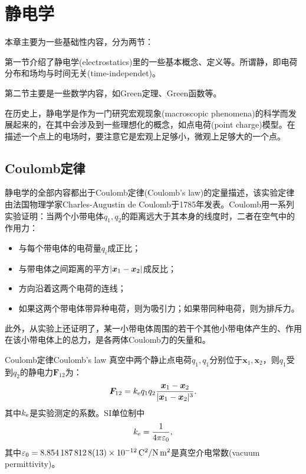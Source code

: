 \chapter{静电学}
\label{chap:electrostatics}

本章主要为一些基础性内容，分为两节：
\begin{compactenum}
    \item 第一节介绍了静电学(electrostatics)里的一些基本概念、定义等。所谓静，即电荷分布和场均与时间无关(time-independet)。
    \item 第二节主要是一些数学内容，如Green定理、Green函数等。
\end{compactenum}
在历史上，静电学是作为一门研究宏观现象(macroscopic phenomena)的科学而发展起来的，在其中会涉及到一些理想化的概念，如点电荷(point charge)模型。在描述一个点上的电场时，要注意它是宏观上足够小，微观上足够大的一个点。

\section{Coulomb定律}

静电学的全部内容都出于Coulomb定律(Coulomb's law)的定量描述，该实验定律由法国物理学家Charles-Augustin de Coulomb于1785年发表。Coulomb用一系列实验证明：当两个小带电体$q_1,q_2$的距离远大于其本身的线度时，二者在空气中的作用力：
\begin{itemize}
    \item 与每个带电体的电荷量$q_i$成正比；
    \item 与带电体之间距离的平方$\left\lvert\bm x_1-\bm x_2\right\rvert$成反比；
    \item 方向沿着这两个电荷的连线；
    \item 如果这两个带电体带异种电荷，则为吸引力；如果带同种电荷，则为排斥力。
\end{itemize}
此外，从实验上还证明了，某一小带电体周围的若干个其他小带电体产生的、作用在该小带电体上的总力，是各两体Coulomb力的矢量和。

\begin{theorem}{Coulomb定律}{Coulomb's law}
    真空中两个静止点电荷$q_1,q_1$分别位于$\bm x_1,\bm x_2$，则$q_1$受到$q_2$的静电力$\bm F_{12}$为：
    \begin{align}
        \label{eqn:Coulomb law}
        \bm F_{12}=k_\mathrm e q_1q_2\frac{\bm x_1-\bm x_2}{|\bm x_1-\bm x_2|^3}.
    \end{align}
    其中$k_\mathrm e$是实验测定的系数。SI单位制中
    \[
        k_\mathrm e=\frac1{4\pi\varepsilon_0},
    \]
    其中$\varepsilon_0=\SI{8.8541878128(13)E-12}{C^2/N.m^2}$是真空介电常数(vacuum permittivity)。
\end{theorem}

